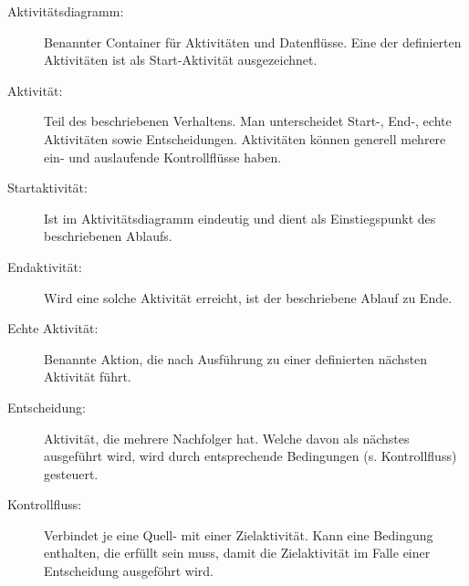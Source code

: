 \documentclass{lehramt-informatik}
\begin{document}
\begin{description}
\item[Aktivitätsdiagramm:]
Benannter Container für Aktivitäten und Datenflüsse. Eine der
definierten Aktivitäten ist als Start-Aktivität ausgezeichnet.

\item[Aktivität:]
Teil des beschriebenen Verhaltens. Man unterscheidet Start-, \mbox{End-,} echte
Aktivitäten sowie Entscheidungen. Aktivitäten können generell mehrere
ein- und auslaufende Kontrollflüsse haben.

\item[Startaktivität:]
Ist im Aktivitätsdiagramm eindeutig und dient als Einstiegspunkt des
beschriebenen Ablaufs.

\item[Endaktivität:]
Wird eine solche Aktivität erreicht, ist der beschriebene Ablauf zu
Ende.

\item[Echte Aktivität:]
Benannte Aktion, die nach Ausführung zu einer definierten nächsten
Aktivität führt.

\item[Entscheidung:]
Aktivität, die mehrere Nachfolger hat. Welche davon als nächstes
ausgeführt wird, wird durch entsprechende Bedingungen (s. Kontrollfluss)
gesteuert.

\item[Kontrollfluss:]
Verbindet je eine Quell- mit einer Zielaktivität. Kann eine Bedingung
enthalten, die erfüllt sein muss, damit die Zielaktivität im Falle einer
Entscheidung ausgeföhrt wird.

\end{description}
\end{document}
